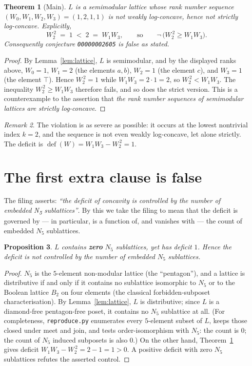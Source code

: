 \documentclass[11pt]{article}
\newtheorem{theorem}{Theorem}
\newtheorem{proposition}[theorem]{Proposition}
\theoremstyle{definition}
\theoremstyle{remark}
\newtheorem{remark}[theorem]{Remark}
\begin{document}
\begin{theorem}[Main]\label{thm:main}
$L$ is a semimodular lattice whose rank number sequence
$(W_0,W_1,W_2,W_3) = (1,2,1,1)$ is not weakly log-concave, hence not strictly
log-concave. Explicitly,
\[
W_2^{\,2} \;=\; 1 \;<\; 2 \;=\; W_1 W_3 ,
\qquad\text{so}\qquad
\neg\,\bigl(W_2^{\,2} \ge W_1 W_3\bigr).
\]
Consequently conjecture \texttt{00000002605} is false as stated.
\end{theorem}

\begin{proof}
By Lemma~\ref{lem:lattice}, $L$ is semimodular, and by the displayed ranks
above, $W_0 = 1$, $W_1 = 2$ (the elements $a,b$), $W_2 = 1$ (the element $c$),
and $W_3 = 1$ (the element $\top$). Hence
$W_2^{\,2} = 1$ while $W_1 W_3 = 2\cdot 1 = 2$, so
$W_2^{\,2} < W_1 W_3$. The inequality $W_2^{\,2} \ge W_1 W_3$ therefore fails,
and so does the strict version. This is a counterexample to the assertion that
\emph{the rank number sequences of semimodular lattices are strictly
log-concave}.
\end{proof}

\begin{remark}
The violation is as severe as possible: it occurs at the lowest nontrivial
index $k=2$, and the sequence is not even weakly log-concave, let alone
strictly. The deficit is $\operatorname{def}(W) = W_1W_3 - W_2^{\,2} = 1$.
\end{remark}

\section{The first extra clause is false}\label{sec:clause1}

The filing asserts: \emph{``the deficit of concavity is controlled by the
number of embedded N\textsubscript{5} sublattices''}. By this we take the
filing to mean that the deficit is governed by --- in particular, is a function
of, and vanishes with --- the count of embedded $N_5$ sublattices.

\begin{proposition}\label{prop:clause1}
$L$ contains \textbf{zero} $N_5$ sublattices, yet has deficit $1$.
Hence the deficit is not controlled by the number of embedded $N_5$
sublattices.
\end{proposition}

\begin{proof}
$N_5$ is the $5$-element non-modular lattice (the ``pentagon''), and a lattice
is distributive if and only if it contains no sublattice isomorphic to $N_5$ or
to the Boolean lattice $B_2$ on four elements (the classical forbidden-subposet
characterisation). By Lemma~\ref{lem:lattice}, $L$ is distributive; since $L$
is a diamond-free pentagon-free poset, it contains no $N_5$ sublattice at all.
(For completeness, \texttt{reproduce.py} enumerates every $5$-element subset of
$L$, keeps those closed under meet and join, and tests order-isomorphism with
$N_5$: the count is $0$; the count of $N_5$ induced subposets is also $0$.)
On the other hand, Theorem~\ref{thm:main} gives deficit
$W_1W_3 - W_2^{\,2} = 2 - 1 = 1 > 0$. A positive deficit with zero $N_5$
sublattices refutes the asserted control.
\end{proof}
\end{document}
